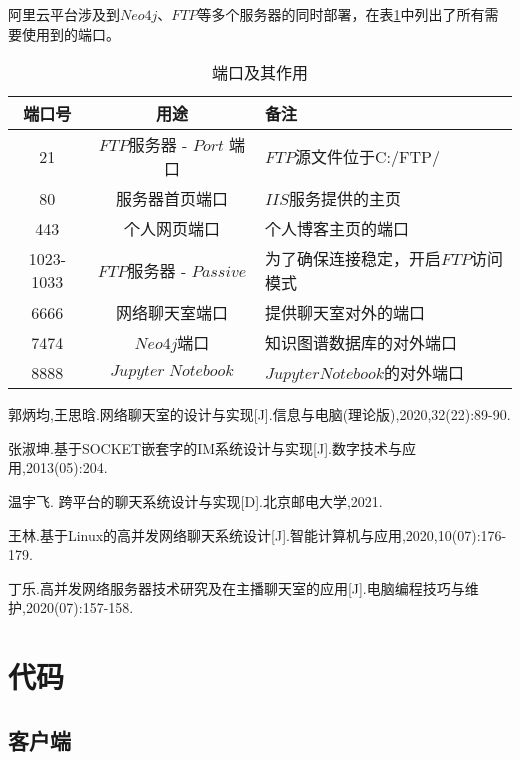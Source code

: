 \documentclass[forprint]{OSPaper}
\begin{document}
阿里云平台涉及到$Neo4j$、$FTP$等多个服务器的同时部署，在表\ref{table:4}中列出了所有需要使用到的端口。

\begin{table}[ht]
	\caption{端口及其作用}
	\label{table:4}
	\begin{tabular}{ccl}
		\hline
		端口号 & 用途     & 备注                         \\ \hline
		21  & $FTP$服务器 - $Port$ 端口   & $FTP$源文件位于C:/FTP/   \\
		80   & 服务器首页端口   & $IIS$服务提供的主页  \\
		443   & 个人网页端口   & 个人博客主页的端口  \\
		1023-1033   & $FTP$服务器 - $Passive$& 为了确保连接稳定，开启$FTP$访问模式  \\
		6666   & 网络聊天室端口   & 提供聊天室对外的端口  \\
		7474   & $Neo4j$端口 & 知识图谱数据库的对外端口        \\
		8888   & $Jupyter \; Notebook$   & $Jupyter Notebook$的对外端口 \\ \hline
	\end{tabular}
\end{table}
\clearpage

\cleardoublepage{}
{}
\begin{thebibliography}{99}

   郭炳均,王思晗.网络聊天室的设计与实现[J].信息与电脑(理论版),2020,32(22):89-90.

   张淑坤.基于SOCKET嵌套字的IM系统设计与实现[J].数字技术与应用,2013(05):204.
  
  温宇飞. 跨平台的聊天系统设计与实现[D].北京邮电大学,2021.
  
  王林.基于Linux的高并发网络聊天系统设计[J].智能计算机与应用,2020,10(07):176-179.
  
  丁乐.高并发网络服务器技术研究及在主播聊天室的应用[J].电脑编程技巧与维护,2020(07):157-158.
\end{thebibliography}

\clearpage
\appendix


\chapter{代码}

\section{客户端}
\end{document}
